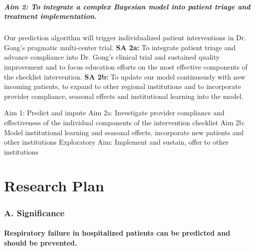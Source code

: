 \documentclass[11pt,notitlepage]{article}
\begin{document}
\subsubsection*{Aim 2: To integrate a complex Bayesian model into patient triage and treatment implementation.}
Our prediction algorithm will trigger individualized patient interventions in Dr. Gong's pragmatic multi-center trial. 
\newline \textbf{SA 2a:} To integrate patient triage and advance compliance into Dr. Gong's clinical trial and sustained quality improvement and to focus education efforts on the most effective components of the checklist intervention.
\newline \textbf{SA 2b:} To update our model continuously with new incoming patients, to expand to other regional institutions and to incorporate provider compliance, seasonal effects and institutional learning into the model.

Aim 1: Predict and impute
Aim 2a: Investigate provider compliance and effectiveness of the individual components of the intervention checklist 
Aim 2b: Model institutional learning and seasonal effects, incorporate new patients and other institutions
Exploratory Aim: Implement and sustain, offer to other institutions

\newpage
\part*{Research Plan}

\section*{A. Significance}

\subsection*{Respiratory failure in hospitalized patients can be predicted and should be prevented.}
\end{document}
